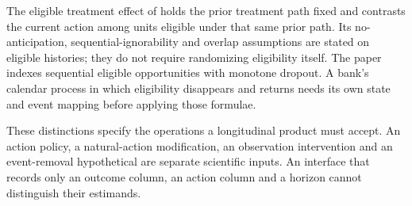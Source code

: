The eligible treatment effect of \citet[Section 2.2, equation (1)]{selective2025}
holds the prior treatment path fixed and contrasts the current action
among units eligible under that same prior path. Its no-anticipation,
sequential-ignorability and overlap assumptions are stated on eligible
histories; they do not require randomizing eligibility itself. The
paper indexes sequential eligible opportunities with monotone dropout.
A bank's calendar process in which eligibility disappears and returns
needs its own state and event mapping before applying those formulae.

These distinctions specify the operations a longitudinal product must
accept. An action policy, a natural-action modification, an
observation intervention and an event-removal hypothetical are separate
scientific inputs. An interface that records only an outcome column,
an action column and a horizon cannot distinguish their estimands.

